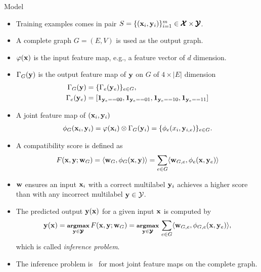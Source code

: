 \documentclass[first=dgreen,second=purple,logo=yellowexc]{aaltoslides}
\begin{document}
%
\begin{frame}[allowframebreaks]{Model}
	\begin{itemize}\footnotesize
		\item Training examples comes in pair $S=\{(\mathbf {x}_i,\mathbf {y}_i)\}_{i=1}^{m}\in\pmb {\mathcal{X}}\times\pmb {\mathcal{Y}}$.
		\item A complete graph $G=(E,V)$ is used as the output graph.
		\item $\varphi(\mathbf {x})$ is the input feature map, e.g., a feature vector of $d$ dimension.
		\item $\Gamma_G(\mathbf {y})$ is the output feature map of $\mathbf {y}$ on $G$ of $4\times |E|$ dimension
		\begin{align*}\footnotesize
			\Gamma_G(\mathbf {y}) &= \{\Gamma_e(\mathbf {y}_{e})\}_{e\in G},\\
			 \Gamma_e(\mathbf {y}_{e}) &= [\mathbf {1}_{\mathbf {y}_{e}==00},\mathbf {1}_{\mathbf {y}_{e}==01},\mathbf {1}_{\mathbf {y}_{e}==10},\mathbf {1}_{\mathbf {y}_{e}==11}]
		\end{align*}
		\item A joint feature map of $(\mathbf {x}_i,\mathbf {y}_i)$
		\begin{align*}\footnotesize
			\phi_G(\mathbf {x}_i,\mathbf {y}_i) = \varphi(\mathbf {x}_i)\otimes\Gamma_G(\mathbf {y}_i) = \{\phi_e(x_i,\mathbf {y}_{i,e})\}_{e\in G}.
		\end{align*}
		\item A compatibility score is defined as
		\begin{align*}\footnotesize
			F(\mathbf {x},\mathbf {y};\mathbf {w}_G) = \langle \mathbf {w}_G, \phi_G(\mathbf {x},\mathbf {y}) \rangle=\sum_{e\in G}\langle \mathbf {w}_{G,e}, \phi_e(\mathbf {x},\mathbf {y}_{e}) \rangle
		\end{align*}
		\item $\mathbf {w}$ ensures an input $\mathbf {x}_i$ with a correct multilabel $\mathbf {y}_i$ achieves a higher score than with any incorrect multilabel $\mathbf {y}\in\mathcal{Y}$.
		\item The predicted output $\mathbf {y}(\mathbf {x})$ for a given input $\mathbf {x}$ is computed by
		\begin{align*}\footnotesize
			\mathbf {y}(\mathbf {x}) = \underset{\mathbf {y}\in\pmb {\mathcal{Y}}}{\textbf{argmax}}\,F(\mathbf {x},\mathbf {y};\mathbf {w}_G) = \underset{\mathbf {y}\in\pmb {\mathcal{Y}}}{\textbf{argmax}}\,\sum_{e\in G}\langle \mathbf {w}_{G,e}, \phi_{G,e}(\mathbf {x},\mathbf {y}_e) \rangle,
		\end{align*}
		which is called \textit{inference problem}.
		\item The {inference problem} is \nphard\ for most joint feature maps on the complete graph.
	\end{itemize}
\end{frame}
\end{document}
